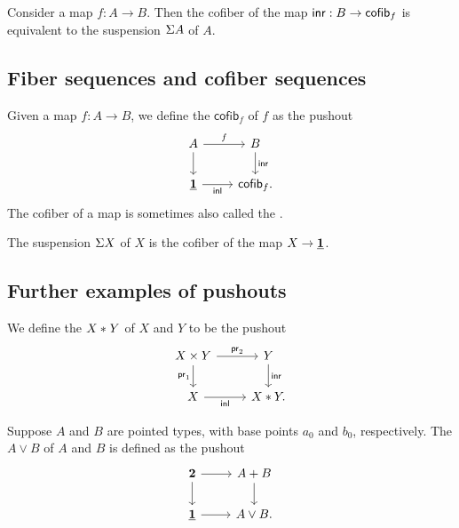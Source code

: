 \begin{lem}
Consider a map $f:A\to B$. Then the cofiber of the map ${\mathsf{inr}}:B\to \mathsf{cofib}_f$ is equivalent to the suspension $\Sigma{A}$ of $A$. 
\end{lem}

\subsection{Fiber sequences and cofiber sequences}

\begin{defn}
Given a map $f:A\to B$, we define the  $\mathsf{cofib}_f$ of $f$ as the pushout
\begin{equation*}
\begin{tikzcd}
A \arrow[r,"f"] \arrow[d] & B \arrow[d,"\inr"] \\
\unit \arrow[r,swap,"\inl"] & \mathsf{cofib}_f. 
\end{tikzcd}
\end{equation*}
The cofiber of a map is sometimes also called the .
\end{defn}

\begin{eg}
The suspension $\Sigma X$ of $X$ is the cofiber of the map $X\to \underline{\mathbf{1}}$. 
\end{eg}

\subsection{Further examples of pushouts}

\begin{defn}
We define the  ${X}\ast_{}{Y}$ of $X$ and $Y$ to be the pushout 
\begin{equation*}
\begin{tikzcd}
X\times Y \arrow[r,"\proj 2"] \arrow[d,swap,"\proj 1"] & Y \arrow[d,"\inr"] \\
X \arrow[r,swap,"\inl"] & X \ast Y. 
\end{tikzcd}
\end{equation*}
\end{defn}

\begin{defn}
Suppose $A$ and $B$ are pointed types, with base points $a_0$ and $b_0$, respectively. The  $A\vee B$ of $A$ and $B$ is defined as the pushout
\begin{equation*}
\begin{tikzcd}
\bool \arrow[r] \arrow[d] & A+B \arrow[d] \\
\unit \arrow[r] & A\vee B.
\end{tikzcd}
\end{equation*}
\end{defn}

